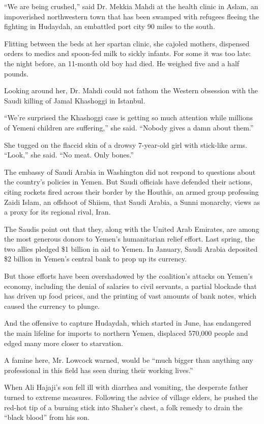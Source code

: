 ``We are being crushed,'' said Dr. Mekkia Mahdi at the health clinic in
Aslam, an impoverished northwestern town that has been swamped with
refugees fleeing the fighting in Hudaydah, an embattled port city 90
miles to the south.

Flitting between the beds at her spartan clinic, she cajoled mothers,
dispensed orders to medics and spoon-fed milk to sickly infants. For
some it was too late: the night before, an 11-month old boy had died. He
weighed five and a half pounds.

Looking around her, Dr. Mahdi could not fathom the Western obsession
with the Saudi killing of Jamal Khashoggi in Istanbul.

``We're surprised the Khashoggi case is getting so much attention while
millions of Yemeni children are suffering,'' she said. ``Nobody gives a
damn about them.''

She tugged on the flaccid skin of a drowsy 7-year-old girl with
stick-like arms. ``Look,'' she said. ``No meat. Only bones.''

The embassy of Saudi Arabia in Washington did not respond to questions
about the country's policies in Yemen. But Saudi officials have defended
their actions, citing rockets fired across their border by the Houthis,
an armed group professing Zaidi Islam, an offshoot of Shiism, that Saudi
Arabia, a Sunni monarchy, views as a proxy for its regional rival, Iran.

The Saudis point out that they, along with the United Arab Emirates, are
among the most generous donors to Yemen's humanitarian relief effort.
Last spring, the two allies pledged \$1 billion in aid to Yemen. In
January, Saudi Arabia deposited \$2 billion in Yemen's central bank to
prop up its currency.

But those efforts have been overshadowed by the coalition's attacks on
Yemen's economy, including the denial of salaries to civil servants, a
partial blockade that has driven up food prices, and the printing of
vast amounts of bank notes, which caused the currency to plunge.

And the offensive to capture Hudaydah, which started in June, has
endangered the main lifeline for imports to northern Yemen, displaced
570,000 people and edged many more closer to starvation.

A famine here, Mr. Lowcock warned, would be ``much bigger than anything
any professional in this field has seen during their working lives.''

When Ali Hajaji's son fell ill with diarrhea and vomiting, the desperate
father turned to extreme measures. Following the advice of village
elders, he pushed the red-hot tip of a burning stick into Shaher's
chest, a folk remedy to drain the ``black blood'' from his son.

